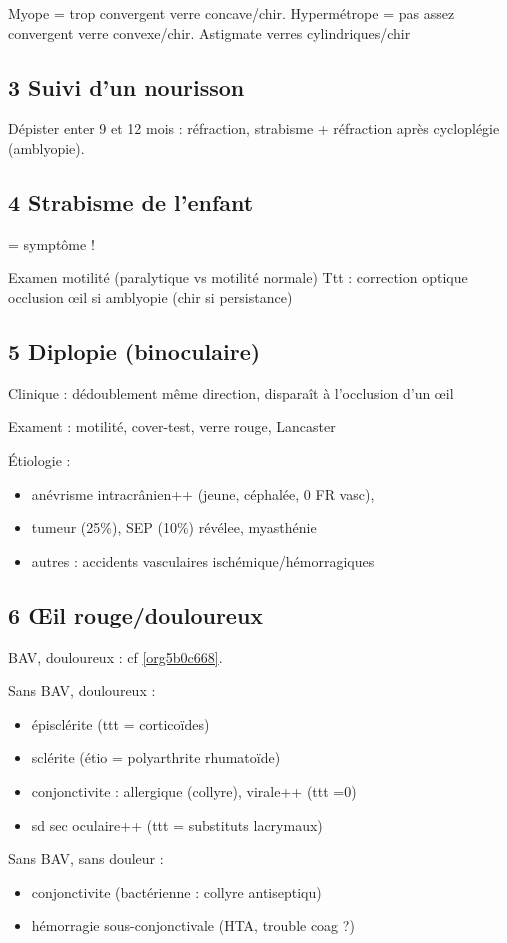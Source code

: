 \documentclass[11pt]{article}
\begin{document}
Myope = trop convergent \thus verre concave/chir. Hypermétrope = pas assez convergent
\thus verre convexe/chir. Astigmate \thus verres cylindriques/chir
\subsection{3 Suivi d'un nourisson}
\label{sec:orgb960852}
Dépister enter 9 et 12 mois : réfraction, strabisme + réfraction après
cycloplégie (amblyopie).
\subsection{4 Strabisme de l'enfant}
\label{sec:orgdfd884b}
= symptôme !

Examen motilité (paralytique vs motilité normale)
Ttt : correction optique \textpm{} occlusion \oe{}il si amblyopie (chir si persistance)
\subsection{5 Diplopie (binoculaire)}
\label{sec:orge6fb9b7}
Clinique : dédoublement même direction, disparaît à l'occlusion d'un \oe{}il

Exament : motilité, cover-test, verre rouge, Lancaster

Étiologie :
\begin{itemize}
\item anévrisme intracrânien++ (jeune, céphalée, 0 FR vasc),
\item tumeur (25\%), SEP (10\%) révélee, myasthénie
\item autres : accidents vasculaires ischémique/hémorragiques
\end{itemize}
\subsection{6 \OE{}il rouge/douloureux}
\label{sec:org03b71f9}
BAV, douloureux : cf \ref{org5b0c668}.

Sans BAV, douloureux : 
\begin{itemize}
\item épisclérite (ttt = corticoïdes)
\item sclérite (étio = polyarthrite rhumatoïde)
\item conjonctivite : allergique (collyre), virale++ (ttt =0)
\item sd sec oculaire++ (ttt = substituts lacrymaux)
\end{itemize}

Sans BAV, sans douleur : 
\begin{itemize}
\item conjonctivite (bactérienne : collyre antiseptiqu)
\item hémorragie sous-conjonctivale (HTA, trouble coag ?)
\end{itemize}
\end{document}
